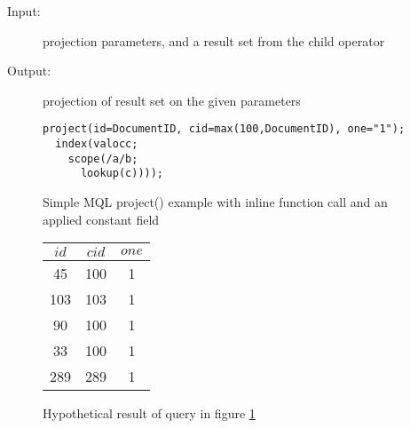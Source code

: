 

\begin{description}
  \item[Input:] projection parameters, and a result set from the child operator
  \item[Output:] projection of result set on the given parameters
\end{description}

\begin{figure}[!h]
\centering
\begin{Verbatim}
project(id=DocumentID, cid=max(100,DocumentID), one="1");
  index(valocc;
    scope(/a/b;
      lookup(c))));
\end{Verbatim}
\caption{Simple MQL \textsf{project()} example with inline function call 
and an applied constant field}
\label{figure:mql:project_example2}
\end{figure}

\begin{figure}[!h]
\centering
\begin{tabular}{|c | c | c |}
\hline
$id$ & $cid$ & $one$ \\ \hline
45 & 100 & 1 \\ \hline
103 & 103 & 1 \\ \hline
90 & 100 & 1 \\ \hline
33 & 100 & 1 \\ \hline
289 & 289 & 1 \\ \hline
\end{tabular}
\caption{Hypothetical result of query in figure
\ref{figure:mql:project_example2}}
\label{figure:mql:project_example2_result}
\end{figure}


